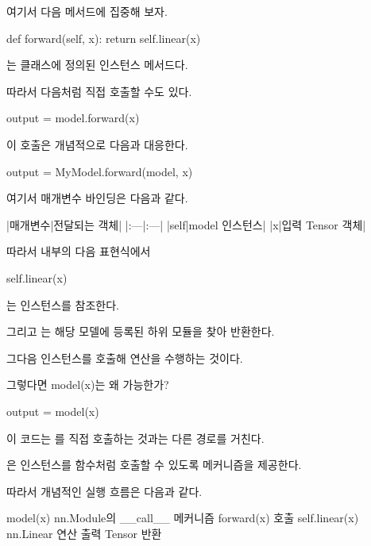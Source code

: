 여기서 다음 메서드에 집중해 보자.

\begin{dhkcode}
def forward(self, x):
    return self.linear(x)
\end{dhkcode}

는  클래스에 정의된 인스턴스 메서드다.

따라서 다음처럼 직접 호출할 수도 있다.

\begin{dhkcode}
output = model.forward(x)
\end{dhkcode}

이 호출은 개념적으로 다음과 대응한다.

\begin{dhkcode}
output = MyModel.forward(model, x)
\end{dhkcode}

여기서 매개변수 바인딩은 다음과 같다.

\begin{dhktable}
|매개변수|전달되는 객체|
|:---|:---|
|self|model 인스턴스|
|x|입력 Tensor 객체|
\end{dhktable}

따라서  내부의 다음 표현식에서

\begin{dhkcode}
self.linear(x)
\end{dhkcode}

는  인스턴스를 참조한다.

그리고 는 해당 모델에 등록된  하위 모듈을 찾아 반환한다.

그다음  인스턴스를 호출해 연산을 수행하는 것이다.

\begin{dhknote}
\begin{dhksmry}[centered]
그렇다면 model(x)는 왜 가능한가?
\end{dhksmry}
\end{dhknote}

\begin{dhkcode}
output = model(x)
\end{dhkcode}

이 코드는 를 직접 호출하는 것과는 다른 경로를 거친다.

은 인스턴스를 함수처럼 호출할 수 있도록  메커니즘을 제공한다.

따라서 개념적인 실행 흐름은 다음과 같다.

\begin{dhksmry}[centered]
model(x)
\da
nn.Module의 __call__ 메커니즘
\da
forward(x) 호출
\da
self.linear(x)
\da
nn.Linear 연산
\da
출력 Tensor 반환
\end{dhksmry}

